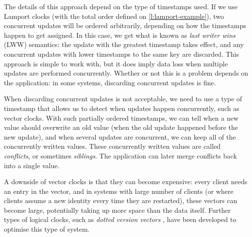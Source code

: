 The details of this approach depend on the type of timestamps used.
If we use Lamport clocks (with the total order defined on \autoref{l:lamport-example}), two concurrent updates will be ordered arbitrarily, depending on how the timestamps happen to get assigned.
In this case, we get what is known as \emph{last writer wins} (LWW) semantics: the update with the greatest timestamp takes effect, and any concurrent updates with lower timestamps to the same key are discarded.
This approach is simple to work with, but it does imply data loss when multiple updates are performed concurrently.
Whether or not this is a problem depends on the application: in some systems, discarding concurrent updates is fine.

When discarding concurrent updates is not acceptable, we need to use a type of timestamp that allows us to detect when updates happen concurrently, such as vector clocks.
With such partially ordered timestamps, we can tell when a new value should overwrite an old value (when the old update happened before the new update), and when several updates are concurrent, we can keep all of the concurrently written values.
These concurrently written values are called \emph{conflicts}, or sometimes \emph{siblings}.
The application can later merge conflicts back into a single value.

A downside of vector clocks is that they can become expensive: every client needs an entry in the vector, and in systems with large number of clients (or where clients assume a new identity every time they are restarted), these vectors can become large, potentially taking up more space than the data itself.
Further types of logical clocks, such as \emph{dotted version vectors} \citep{Preguica:2010}, have been developed to optimise this type of system.

